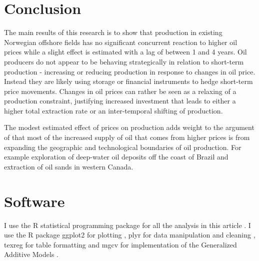 \documentclass[11pt]{article}
\begin{document}
\section{Conclusion}

The main results of this research is to show that production in existing Norwegian offshore fields has no significant concurrent reaction to higher oil prices while a slight effect is estimated  with a lag of between 1 and 4 years.  Oil producers do not appear to be behaving strategically in relation to short-term production - increasing or reducing production in response to changes in oil price.  Instead they are likely using storage or financial instruments to hedge short-term price movements. Changes in oil prices can rather be seen as a relaxing of a production constraint, justifying increased investment that leads to either a higher total extraction rate or an inter-temporal shifting of production.

The modest estimated effect of prices on production adds weight to the argument of \citet{hamilton_oil_2012} that most of the increased supply of oil that comes from higher prices is from expanding the geographic and technological boundaries of oil production.  For example exploration of deep-water oil deposits off the coast of Brazil and extraction of oil sands in western Canada.   

\section{Software}
I use the R statistical programming package for all the analysis in this article \citep{r_core_team_r:_2013}.  I use the R package ggplot2 for plotting \citep{wickham_ggplot2:_2009}, plyr for data manipulation and cleaning \citep{wickham_split-apply-combine_2011}, texreg for table formatting \citep{leifeld_texreg:_2013} and mgcv for implementation of the Generalized Additive Models \citep{wood_fast_2011}.




\FloatBarrier
\end{document}
